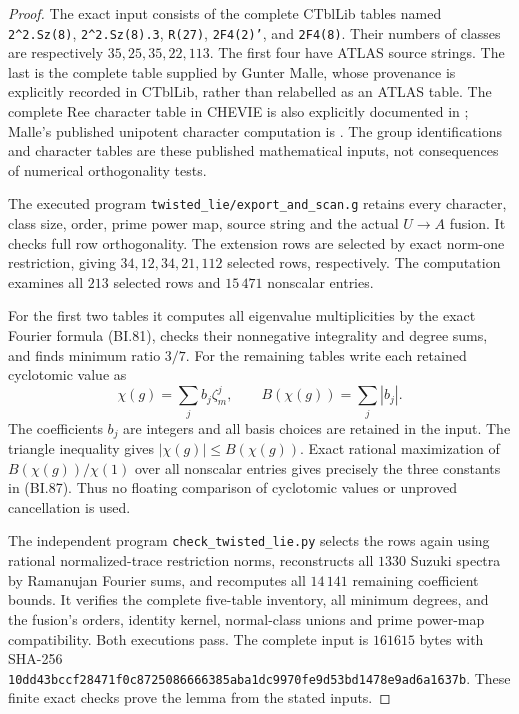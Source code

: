 \begin{proof}
The exact input consists of the complete CTblLib tables named
\texttt{2\^{}2.Sz(8)}, \texttt{2\^{}2.Sz(8).3},
\texttt{R(27)}, \texttt{2F4(2)'}, and \texttt{2F4(8)}.
Their numbers of classes are respectively $35,25,35,22,113$.
The first four have ATLAS source strings.  The last is the
complete table supplied by Gunter Malle, whose provenance is
explicitly recorded in CTblLib, rather than relabelled as an
ATLAS table.  The complete Ree character table in CHEVIE is
also explicitly documented in \cite[\S10.2, numbered p.~131,
before Proposition~10.4]{BI:HHM}; Malle's published unipotent
character computation is \cite{BI:MalleRee}.
The group identifications and character tables are these
published mathematical inputs, not consequences of numerical
orthogonality tests.

The executed program \texttt{twisted\_lie/export\_and\_scan.g}
retains every character, class size, order, prime power map,
source string and the actual $U\to A$ fusion.  It checks full
row orthogonality.  The extension rows are selected by exact
norm-one restriction, giving $34,12,34,21,112$ selected rows,
respectively.  The computation examines all $213$ selected rows
and $15\,471$ nonscalar entries.

For the first two tables it computes all eigenvalue multiplicities
by the exact Fourier formula (BI.81), checks their nonnegative
integrality and degree sums, and finds minimum ratio $3/7$.
For the remaining tables write each retained cyclotomic value as
\[
                 \chi(g)=\sum_j b_j\zeta_m^j,
                 \qquad B(\chi(g))=\sum_j|b_j|.
\]
The coefficients $b_j$ are integers and all basis choices are
retained in the input.  The triangle inequality gives
$|\chi(g)|\le B(\chi(g))$.  Exact rational maximization of
$B(\chi(g))/\chi(1)$ over all nonscalar entries gives precisely
the three constants in (BI.87).  Thus no floating comparison of
cyclotomic values or unproved cancellation is used.

The independent program \texttt{check\_twisted\_lie.py} selects
the rows again using rational normalized-trace restriction norms,
reconstructs all $1330$ Suzuki spectra by Ramanujan Fourier sums,
and recomputes all $14\,141$ remaining coefficient bounds.
It verifies the complete five-table inventory, all minimum degrees,
and the fusion's orders, identity kernel, normal-class unions and
prime power-map compatibility.  Both executions pass.
The complete input is $161615$ bytes with SHA-256
\texttt{10dd43bccf28471f0c8725086666385aba1dc9970fe9d53bd1478e9ad6a1637b}.
These finite exact checks prove the lemma from the stated inputs.
\end{proof}

